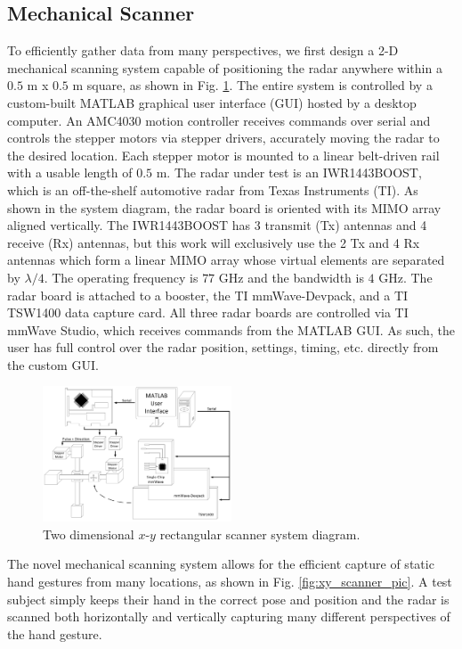 \documentclass{ieeeaccess}
\begin{document}
\subsection{Mechanical Scanner}
\label{subsec:mechanical_scanner}
To efficiently gather data from many perspectives, we first design a 2-D mechanical scanning system capable of positioning the radar anywhere within a $0.5$ m x $0.5$ m square, as shown in Fig. \ref{fig:xy_scanner_system_diagram}. The entire system is controlled by a custom-built MATLAB graphical user interface (GUI) hosted by a desktop computer. An AMC4030 motion controller receives commands over serial and controls the stepper motors via stepper drivers, accurately moving the radar to the desired location. Each stepper motor is mounted to a linear belt-driven rail with a usable length of $0.5$ m. The radar under test is an IWR1443BOOST, which is an off-the-shelf automotive radar from Texas Instruments (TI). As shown in the system diagram, the radar board is oriented with its MIMO array aligned vertically. The IWR1443BOOST has 3 transmit (Tx) antennas and 4 receive (Rx) antennas, but this work will exclusively use the 2 Tx and 4 Rx antennas which form a linear MIMO array whose virtual elements are separated by $\lambda/4$. The operating frequency is $77$ GHz and the bandwidth is $4$ GHz. The radar board is attached to a booster, the TI mmWave-Devpack, and a TI TSW1400 data capture card. All three radar boards are controlled via TI mmWave Studio, which receives commands from the MATLAB GUI. As such, the user has full control over the radar position, settings, timing, etc. directly from the custom GUI. 

\begin{figure}[h]
    \centering
    \includegraphics[width=0.5\textwidth]{xy_scanner_system_diagram.png}
    \caption{Two dimensional $x$-$y$ rectangular scanner system diagram.}
    \label{fig:xy_scanner_system_diagram}
\end{figure}

The novel mechanical scanning system allows for the efficient capture of static hand gestures from many locations, as shown in Fig. \ref{fig:xy_scanner_pic}. A test subject simply keeps their hand in the correct pose and position and the radar is scanned both horizontally and vertically capturing many different perspectives of the hand gesture. 
\end{document}
